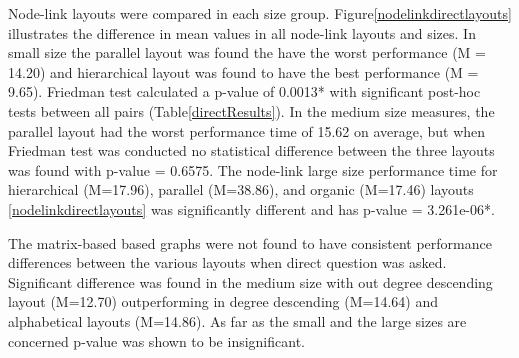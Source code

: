 \documentclass{l4proj}
\begin{document}
Node-link layouts were compared in each size group. Figure\ref{nodelinkdirectlayouts} illustrates the difference in mean values in all node-link layouts and sizes. In small size the parallel layout was found the have the worst performance (M = 14.20) and hierarchical layout was found to have the best performance (M = 9.65). Friedman test calculated a p-value of 0.0013* with significant post-hoc tests between all pairs (Table\ref{directResults}). In the medium size measures, the parallel layout had the worst performance time of 15.62 on average, but when Friedman test was conducted no statistical difference between the three layouts was found with p-value = 0.6575. The node-link large size performance time for hierarchical (M=17.96), parallel (M=38.86), and organic (M=17.46) layouts \ref{nodelinkdirectlayouts} was significantly different and has p-value = 3.261e-06*. 

The matrix-based based graphs were not found to have consistent performance differences between the various layouts when direct question was asked. Significant difference was found in the medium size with out degree descending layout (M=12.70) outperforming in degree descending (M=14.64) and alphabetical layouts (M=14.86). As far as the small and the large sizes are concerned p-value was shown to be insignificant.
\end{document}
